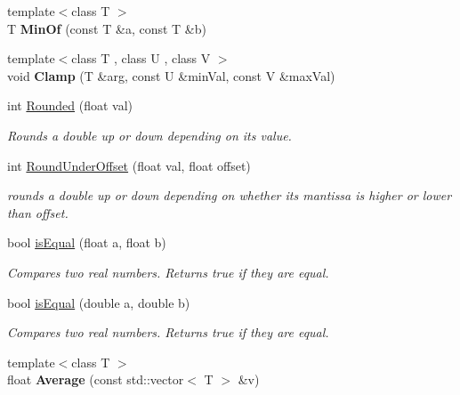 \begin{DoxyCompactItemize}
\item 
\hypertarget{namespacesteer_a217837f04be9717f24cf243954995f59}{{\footnotesize template$<$class T $>$ }\\T {\bfseries Min\-Of} (const T \&a, const T \&b)}\label{namespacesteer_a217837f04be9717f24cf243954995f59}

\item 
\hypertarget{namespacesteer_a79ad745a701b1b29ac15922e6f0b8ac2}{{\footnotesize template$<$class T , class U , class V $>$ }\\void {\bfseries Clamp} (T \&arg, const U \&min\-Val, const V \&max\-Val)}\label{namespacesteer_a79ad745a701b1b29ac15922e6f0b8ac2}

\item 
int \hyperlink{namespacesteer_ae6dff5dd426bb2760e58cff4184b8452}{Rounded} (float val)
\begin{DoxyCompactList}\small\item\em Rounds a double up or down depending on its value. \end{DoxyCompactList}\item 
int \hyperlink{namespacesteer_a9cbc7df83ecb016c7ae78655e246e8cf}{Round\-Under\-Offset} (float val, float offset)
\begin{DoxyCompactList}\small\item\em rounds a double up or down depending on whether its mantissa is higher or lower than offset. \end{DoxyCompactList}\item 
bool \hyperlink{namespacesteer_a523f700d20560f6217fa145c0de7a3f0}{is\-Equal} (float a, float b)
\begin{DoxyCompactList}\small\item\em Compares two real numbers. Returns true if they are equal. \end{DoxyCompactList}\item 
bool \hyperlink{namespacesteer_ab84c23ecc5046c6ef8e22ded45af0f49}{is\-Equal} (double a, double b)
\begin{DoxyCompactList}\small\item\em Compares two real numbers. Returns true if they are equal. \end{DoxyCompactList}\item 
\hypertarget{namespacesteer_a5a4a3b96d811360acc3dd444e3af8b13}{{\footnotesize template$<$class T $>$ }\\float {\bfseries Average} (const std\-::vector$<$ T $>$ \&v)}\label{namespacesteer_a5a4a3b96d811360acc3dd444e3af8b13}


\end{DoxyCompactItemize}
